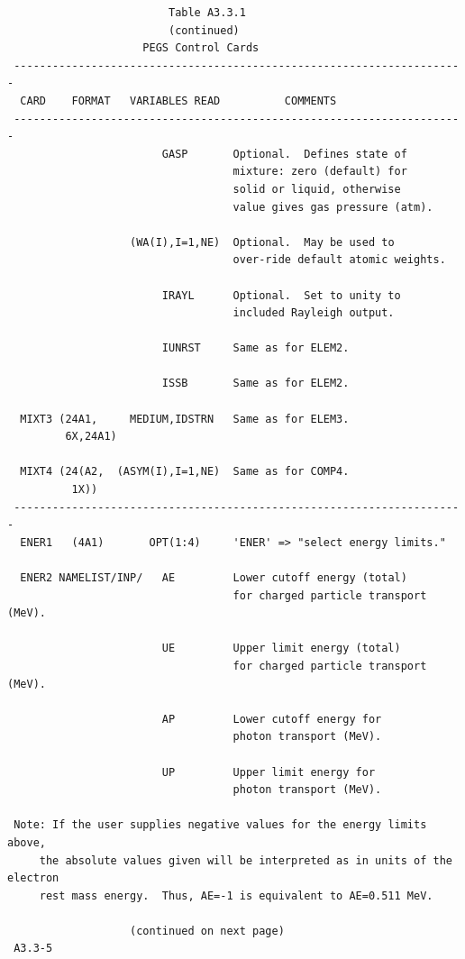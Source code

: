 \newpage {} \begin{verbatim}
                         Table A3.3.1
                         (continued)
                     PEGS Control Cards
 ----------------------------------------------------------------------
  CARD    FORMAT   VARIABLES READ          COMMENTS
 ----------------------------------------------------------------------
                        GASP       Optional.  Defines state of
                                   mixture: zero (default) for
                                   solid or liquid, otherwise
                                   value gives gas pressure (atm).
 
                   (WA(I),I=1,NE)  Optional.  May be used to
                                   over-ride default atomic weights.
 
                        IRAYL      Optional.  Set to unity to
                                   included Rayleigh output.
 
                        IUNRST     Same as for ELEM2.
 
                        ISSB       Same as for ELEM2.
 
  MIXT3 (24A1,     MEDIUM,IDSTRN   Same as for ELEM3.
         6X,24A1)
 
  MIXT4 (24(A2,  (ASYM(I),I=1,NE)  Same as for COMP4.
          1X))
 ----------------------------------------------------------------------
  ENER1   (4A1)       OPT(1:4)     'ENER' => "select energy limits."
 
  ENER2 NAMELIST/INP/   AE         Lower cutoff energy (total)
                                   for charged particle transport (MeV).
 
                        UE         Upper limit energy (total)
                                   for charged particle transport (MeV).
 
                        AP         Lower cutoff energy for
                                   photon transport (MeV).
 
                        UP         Upper limit energy for
                                   photon transport (MeV).
 
 Note: If the user supplies negative values for the energy limits above,
     the absolute values given will be interpreted as in units of the electron
     rest mass energy.  Thus, AE=-1 is equivalent to AE=0.511 MeV.

                   (continued on next page)
 A3.3-5
\end{verbatim} 
